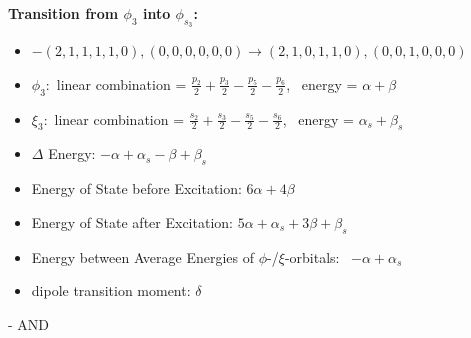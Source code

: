 \documentclass[12pt,a4paper]{article}
\begin{document}
        \noindent\textbf{Transition from $\phi_{3}$ into $\phi_{s_{3}}$:}
        \begin{itemize}
            \item $- (2, 1, 1, 1, 1, 0), (0, 0, 0, 0, 0, 0) \rightarrow (2, 1, 0, 1, 1, 0), (0, 0, 1, 0, 0, 0)$
        
            \item $\phi_{3}:$ linear combination = $\frac{p_{2}}{2} + \frac{p_{3}}{2} - \frac{p_{5}}{2} - \frac{p_{6}}{2}$, \
            energy = $\alpha + \beta$
            
            \item $\xi_{3}:$ linear combination = $\frac{s_{2}}{2} + \frac{s_{3}}{2} - \frac{s_{5}}{2} - \frac{s_{6}}{2}$, \
            energy = $\alpha_{s} + \beta_{s}$
            
            \item $\Delta$ Energy: $- \alpha + \alpha_{s} - \beta + \beta_{s}$
            \item Energy of State before Excitation: $6 \alpha + 4 \beta$
            \item Energy of State after Excitation: $5 \alpha + \alpha_{s} + 3 \beta + \beta_{s}$
            \item Energy between Average Energies of $\phi$-/$\xi$-orbitals: \
            $- \alpha + \alpha_{s}$
        
            \item dipole transition moment: $\delta$
        
        \end{itemize}
        
 -  AND 
\end{document}
